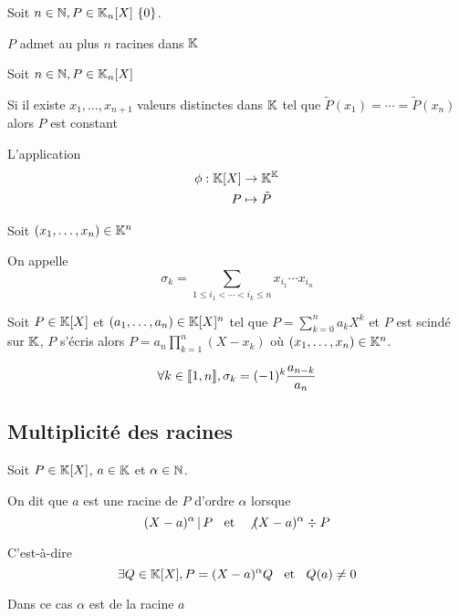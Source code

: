 \begin{cor}
  Soit $n \in \N, P \in \K_n[X] \\\ \{0\}$.

  $P$ admet au plus $n$ racines dans $\mathbb{K}$
\end{cor}

\begin{cor}
  Soit $n \in \mathbb{N}, P \in \mathbb{K}_n[X]$

  Si il existe $x_1, \ldots, x_{n + 1}$ valeurs distinctes dans $\mathbb{K}$ tel que
  $\tilde{P}(x_1) = \cdots = \tilde{P}(x_n)$ alors $P$ est constant
\end{cor}

\begin{cor}
  L'application
  \begin{align*}
    \phi : \mathbb{K}[X] &\to \mathbb{K}^{\mathbb{K}} \\
      P &\mapsto \tilde{P}
  \end{align*}
\end{cor}

\begin{dfn}
  Soit $(x_1, \ldots, x_n) \in \mathbb{K}^n$
  
  On appelle 
  \[
    \sigma_k = \sum_{1 \leq i_1 < \cdots < i_k \leq n} x_{i_1} \cdots x_{i_n}
  \]
\end{dfn}

\begin{prp}
  Soit $P \in \mathbb{K}[X]$ et $(a_1, \ldots, a_n) \in \mathbb{K}[X]^n$ tel que
  $P = \sum^n_{k = 0} a_k X^k$ et $P$ est scindé sur $\mathbb{K}$,
  $P$ s'écris alors $P = a_n \prod^n_{k = 1} (X - x_k)$ où
  $(x_1, \ldots, x_n) \in \mathbb{K}^n$.

  \[
    \forall k \in \llbracket 1, n \rrbracket, \sigma_k = (-1)^k \frac{a_{n - k}}{a_n}
  \]
\end{prp}


\subsection{Multiplicité des racines}

\begin{dfn}
  Soit $P \in \mathbb{K}[X]$, $a \in \mathbb{K}$ et $\alpha \in \mathbb{N}$.

  On dit que $a$ est une racine de $P$ d'ordre $\alpha$
  lorsque
  \[
    (X - a)^\alpha \operatorname{|} P \;\;\text{ et }\;\; \not (X - a)^\alpha \div P
  \]

  C'est-à-dire
  \[
    \exists Q \in \mathbb{K}[X], P = (X - a)^\alpha Q \;\;\text{ et }\;\; Q(a) \neq 0
  \]

  Dans ce cas $\alpha$ est  de la racine $a$
\end{dfn}

